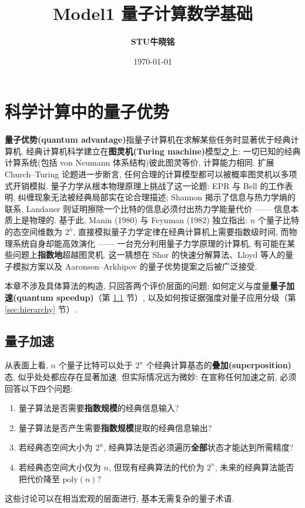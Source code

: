 \documentclass[utf8]{article} %
\title{\textbf{Model1 量子计算数学基础}}
\date{\today}
\author{\textbf{STU\quad 牛晓铭}}
\numberwithin{equation}{section}   %
\begin{document}
  
\maketitle
\renewcommand{\contentsname}{} 
\tableofcontents
\thispagestyle{empty}
	
\newpage
\setcounter{page}{1}
\section{科学计算中的量子优势}

\textbf{量子优势(quantum advantage)}指量子计算机在求解某些任务时显著优于经典计算机. 经典计算机科学建立在\textbf{图灵机(Turing machine)}模型之上: 一切已知的经典计算系统(包括 von Neumann 体系结构)彼此图灵等价, 计算能力相同. 扩展 Church–Turing 论题进一步断言, 任何合理的计算模型都可以被概率图灵机以多项式开销模拟. 量子力学从根本物理原理上挑战了这一论题: EPR 与 Bell 的工作表明, 纠缠现象无法被经典局部实在论合理描述; Shannon 揭示了信息与热力学熵的联系, Landauer 则证明擦除一个比特的信息必须付出热力学能量代价 —— 信息本质上是物理的. 基于此, Manin (1980) 与 Feynman (1982) 独立指出: $n$ 个量子比特的态空间维数为 $2^n$, 直接模拟量子力学定律在经典计算机上需要指数级时间, 而物理系统自身却能高效演化 —— 一台充分利用量子力学原理的计算机, 有可能在某些问题上\textbf{指数地}超越图灵机. 这一猜想在 Shor 的快速分解算法、Lloyd 等人的量子模拟方案以及 Aaronson–Arkhipov 的量子优势提案之后被广泛接受.

本章不涉及具体算法的构造, 只回答两个评价层面的问题: 如何定义与度量\textbf{量子加速(quantum speedup)}（第 \ref{sec:speedup} 节）, 以及如何按证据强度对量子应用分级（第 \ref{sec:hierarchy} 节）.

\subsection{量子加速}\label{sec:speedup}

从表面上看, $n$ 个量子比特可以处于 $2^n$ 个经典计算基态的\textbf{叠加(superposition)}态, 似乎处处都应存在显著加速. 但实际情况远为微妙: 在宣称任何加速之前, 必须回答以下四个问题:
\begin{enumerate}
    \item 量子算法是否需要\textbf{指数规模}的经典信息输入?
    \item 量子算法是否产生需要\textbf{指数规模}提取的经典信息输出?
    \item 若经典态空间大小为 $2^n$, 经典算法是否必须遍历\textbf{全部}状态才能达到所需精度?
    \item 若经典态空间大小仅为 $n$, 但现有经典算法的代价为 $2^n$, 未来的经典算法能否把代价降至 $\mathrm{poly}(n)$?
\end{enumerate}
这些讨论可以在相当宏观的层面进行, 基本无需复杂的量子术语.
\end{document}
